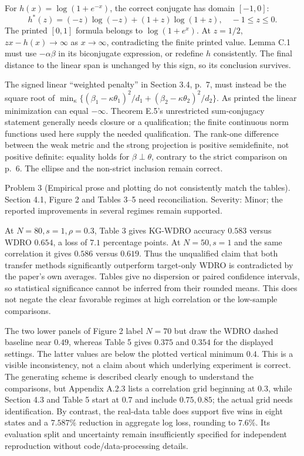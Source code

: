 \documentclass[10pt]{article}
\begin{document}
For \(h(x)=\log(1+e^{-x})\), the correct conjugate has domain \([-1,0]\): \[h^*(z)=(-z)\log(-z)+(1+z)\log(1+z),\quad -1\leq z\leq0.\] The printed \([0,1]\) formula belongs to \(\log(1+e^x)\). At \(z=1/2\), \(zx-h(x)\to\infty\) as \(x\to\infty\), contradicting the finite printed value. Lemma C.1 must use \(-\alpha\beta\) in its biconjugate expression, or redefine \(h\) consistently. The final distance to the linear span is unchanged by this sign, so its conclusion survives.\par
The signed linear “weighted penalty” in Section 3.4, p. 7, must instead be the square root of \(\min_\kappa\{(\beta_1-\kappa\theta_1)^2/d_1+
(\beta_2-\kappa\theta_2)^2/d_2\}\). As printed the linear minimization can equal \(-\infty\). Theorem E.5’s unrestricted sum-conjugacy statement generally needs closure or a qualification; the finite continuous norm functions used here supply the needed qualification. The rank-one difference between the weak metric and the strong projection is positive semidefinite, not positive definite: equality holds for \(\beta\perp\theta\), contrary to the strict comparison on p. 6. The ellipse and the non-strict inclusion remain correct.\par
Problem 3 (Empirical prose and plotting do not consistently match the tables).  Section 4.1, Figure 2 and Tables 3–5 need reconciliation. Severity: Minor; the reported improvements in several regimes remain supported.\par
At \(N=80,s=1,\rho=0.3\), Table 3 gives KG-WDRO accuracy \(0.583\) versus WDRO \(0.654\), a loss of \(7.1\) percentage points. At \(N=50,s=1\) and the same correlation it gives \(0.586\) versus \(0.619\). Thus the unqualified claim that both transfer methods significantly outperform target-only WDRO is contradicted by the paper’s own averages. Tables give no dispersion or paired confidence intervals, so statistical significance cannot be inferred from their rounded means. This does not negate the clear favorable regimes at high correlation or the low-sample comparisons.\par
The two lower panels of Figure 2 label \(N=70\) but draw the WDRO dashed baseline near \(0.49\), whereas Table 5 gives \(0.375\) and \(0.354\) for the displayed settings. The latter values are below the plotted vertical minimum \(0.4\). This is a visible inconsistency, not a claim about which underlying experiment is correct. The generating scheme is described clearly enough to understand the comparisons, but Appendix A.2.3 lists a correlation grid beginning at \(0.3\), while Section 4.3 and Table 5 start at \(0.7\) and include \(0.75,0.85\); the actual grid needs identification. By contrast, the real-data table does support five wins in eight states and a \(7.587\%\) reduction in aggregate log loss, rounding to \(7.6\%\). Its evaluation split and uncertainty remain insufficiently specified for independent reproduction without code/data-processing details.\par
\end{document}
